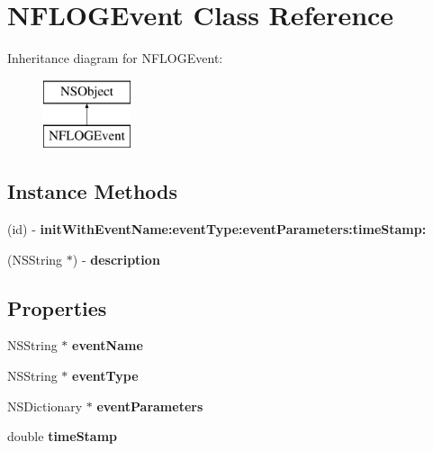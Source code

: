 \hypertarget{interface_n_f_l_o_g_event}{}\section{N\+F\+L\+O\+G\+Event Class Reference}
\label{interface_n_f_l_o_g_event}
Inheritance diagram for N\+F\+L\+O\+G\+Event\+:\begin{figure}[H]
\begin{center}
\leavevmode
\includegraphics[height=2.000000cm]{interface_n_f_l_o_g_event}
\end{center}
\end{figure}
\subsection*{Instance Methods}
\begin{DoxyCompactItemize}
\item 
\mbox{\label{interface_n_f_l_o_g_event_ad1ab207aca486a4b31fe8e74c7559ac0}} 
(id) -\/ {\bfseries init\+With\+Event\+Name\+:event\+Type\+:event\+Parameters\+:time\+Stamp\+:}
\item 
\mbox{\label{interface_n_f_l_o_g_event_a466729f93dbef38aa5f2f81c07df29fe}} 
(N\+S\+String $\ast$) -\/ {\bfseries description}
\end{DoxyCompactItemize}
\subsection*{Properties}
\begin{DoxyCompactItemize}
\item 
\mbox{\label{interface_n_f_l_o_g_event_afa8e79c60a04ed4fbd8d7e95995e1d2d}} 
N\+S\+String $\ast$ {\bfseries event\+Name}
\item 
\mbox{\label{interface_n_f_l_o_g_event_a58db67718b5a8905f1fb3bd3f04bf4e3}} 
N\+S\+String $\ast$ {\bfseries event\+Type}
\item 
\mbox{\label{interface_n_f_l_o_g_event_add7d9bb77492d6d254d6e731d9e6ed8b}} 
N\+S\+Dictionary $\ast$ {\bfseries event\+Parameters}
\item 
\mbox{\label{interface_n_f_l_o_g_event_a79368262e03e155887422a6ca470dcdb}} 
double {\bfseries time\+Stamp}
\end{DoxyCompactItemize}


